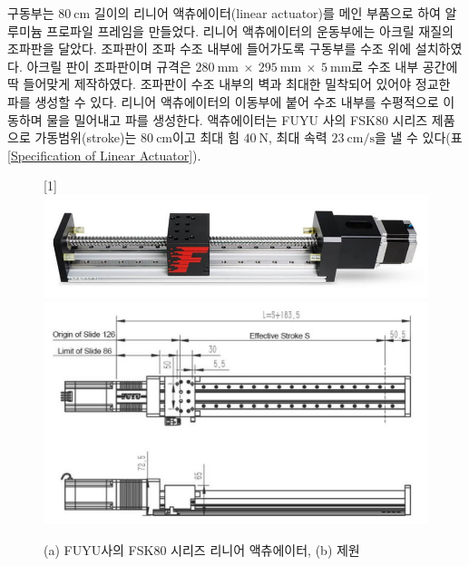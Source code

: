 구동부는 $80\mathrm{~cm}$ 길이의 리니어 액츄에이터(linear actuator)를 메인 부품으로 하여 알루미늄 프로파일 프레임을 만들었다. 리니어 액츄에이터의 운동부에는 아크릴 재질의 조파판을 달았다. 조파판이 조파 수조 내부에 들어가도록 구동부를 수조 위에 설치하였다. 아크릴 판이 조파판이며 규격은 $280\mathrm{~mm} ~\times~ 295\mathrm{~mm} ~\times~5\mathrm{~mm}$로 수조 내부 공간에 딱 들어맞게 제작하였다. 조파판이 수조 내부의 벽과 최대한 밀착되어 있어야 정교한 파를 생성할 수 있다. 리니어 액츄에이터의 이동부에 붙어 수조 내부를 수평적으로 이동하며 물을 밀어내고 파를 생성한다. 액츄에이터는 FUYU 사의 FSK80 시리즈 제품으로 가동범위(stroke)는 $80\mathrm{~cm}$이고 최대 힘 $40\mathrm{~N}$, 최대 속력 $23\mathrm{~cm/s}$을 낼 수 있다(표 \ref{Specification of Linear Actuator}).


\begin{figure}[H]
    \begin{center}
        \scalebox{-1}[1]{\includegraphics[width = 12cm]{images/Linear_Actuator.jpg}}
        \includegraphics[width = 12cm]{images/Linear_Actuator(Design).jpg}
    \end{center}
        \caption{(a) FUYU사의 FSK80 시리즈 리니어 액츄에이터, (b) 제원}
        \label{linear actuator}
\end{figure}

